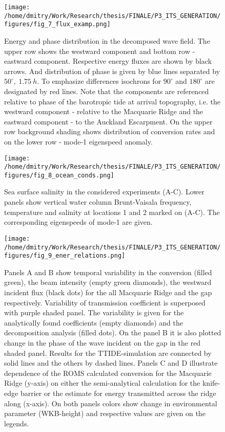 \documentclass[12pt]{article}
\newcommand{\SCALEO}{2}
\newcommand{\SCALET}{1.5}
\begin{document}
\begin{figure}
	\centering
	\texttt{[image: /home/dmitry/Work/Research/thesis/FINALE/P3\_ITS\_GENERATION/figures/fig\_7\_flux\_examp.png]}
	\caption{Energy and phase distribution in the decomposed wave field. The upper row shows the 
	westward component and bottom row - eastward component. Respective energy fluxes are shown by 
	black arrows. And distribution of phase is given by blue lines separated by 
	$50^{\circ},~1.75~h$. To emphasize differences isochrons for $90^{\circ}$ and $180^{\circ}$ are 
	designated by red lines. Note that the components are referenced relative to phase of the 
	barotropic tide at arrival topography, i.e. the westward component  - relative to the 
	Macquarie Ridge and the eastward component - to the Auckland Escarpment. On the upper row 
	background shading shows distribution of conversion rates and on the lower row - mode-1 
	eigenspeed anomaly.}
	\label{C3.fig:wv_fld_dist}
\end{figure}

\begin{figure}
	\centering
	\texttt{[image: /home/dmitry/Work/Research/thesis/FINALE/P3\_ITS\_GENERATION/figures/fig\_8\_ocean\_conds.png]}
	\caption{Sea surface salinity in the considered experiments (A-C). Lower panels show 
	vertical water column Brunt-Vaisala frequency, temperature and salinity at locations 1 and 2 
	marked on (A-C). The corresponding eigenspeeds of mode-1 are given.}
	\label{C3.fig:ocean_cond}
\end{figure}

\begin{figure}
	\centering
	\texttt{[image: /home/dmitry/Work/Research/thesis/FINALE/P3\_ITS\_GENERATION/figures/fig\_9\_ener\_relations.png]}
	\caption{Panels A and B show temporal variability in the conversion (filled green), the beam 
	intensity 	(empty green diamonds), the westward incident flux (black dots) for the all 
	Macquarie Ridge and the gap respectively. Variability of transmission coefficient is superposed 
	with purple shaded panel. The variability is given for the analytically found coefficients 
	(empty diamonds) and the decomposition analysis (filled dots). On the panel B it is also 
	plotted change in the phase of the wave incident on the gap in the red shaded panel. Results 
	for the 
	TTIDE-simulation are connected by solid lines and the others by dashed lines. Panels C and D 
	illustrate dependence of the ROMS calculated conversion for the Macquarie Ridge (y-axis) on 
	either the semi-analytical calculation for the knife-edge barrier or the estimate for 
	energy transmitted across the ridge along (x-axis). On both panels colors show change in 
	environmental parameter (WKB-height) and respective values are given on the legends.}
	\label{C3.fig:ener_var}
\end{figure}
\end{document}
